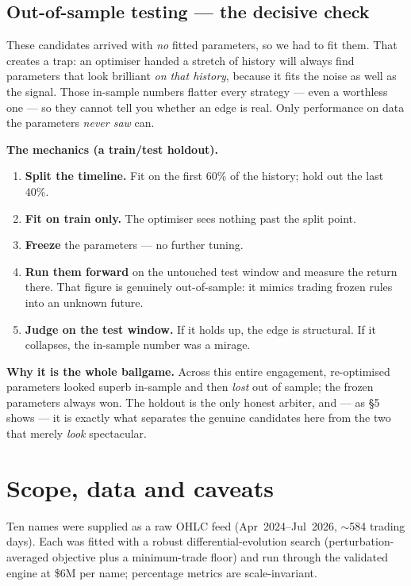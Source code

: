 \documentclass[11pt]{article}
\begin{document}
\subsection{Out-of-sample testing --- the decisive check}

These candidates arrived with \emph{no} fitted parameters, so we had to fit them. That creates a
trap: an optimiser handed a stretch of history will always find parameters that look brilliant
\emph{on that history}, because it fits the noise as well as the signal. Those in-sample numbers
flatter every strategy --- even a worthless one --- so they cannot tell you whether an edge is
real. Only performance on data the parameters \emph{never saw} can.

\textbf{The mechanics (a train/test holdout).}
\begin{enumerate}[leftmargin=1.6em,itemsep=1pt]
  \item \textbf{Split the timeline.} Fit on the first 60\% of the history; hold out the last 40\%.
  \item \textbf{Fit on train only.} The optimiser sees nothing past the split point.
  \item \textbf{Freeze} the parameters --- no further tuning.
  \item \textbf{Run them forward} on the untouched test window and measure the return there.
        That figure is genuinely out-of-sample: it mimics trading frozen rules into an unknown
        future.
  \item \textbf{Judge on the test window.} If it holds up, the edge is structural. If it
        collapses, the in-sample number was a mirage.
\end{enumerate}

\textbf{Why it is the whole ballgame.} Across this entire engagement, re-optimised parameters
looked superb in-sample and then \emph{lost} out of sample; the frozen parameters always won.
The holdout is the only honest arbiter, and --- as \S5 shows --- it is exactly what separates the
genuine candidates here from the two that merely \emph{look} spectacular.

\section{Scope, data and caveats}

Ten names were supplied as a raw OHLC feed (Apr~2024--Jul~2026, $\sim$584 trading days). Each
was fitted with a robust differential-evolution search (perturbation-averaged objective plus a
minimum-trade floor) and run through the validated engine at \$6M per name; percentage metrics
are scale-invariant.
\end{document}
